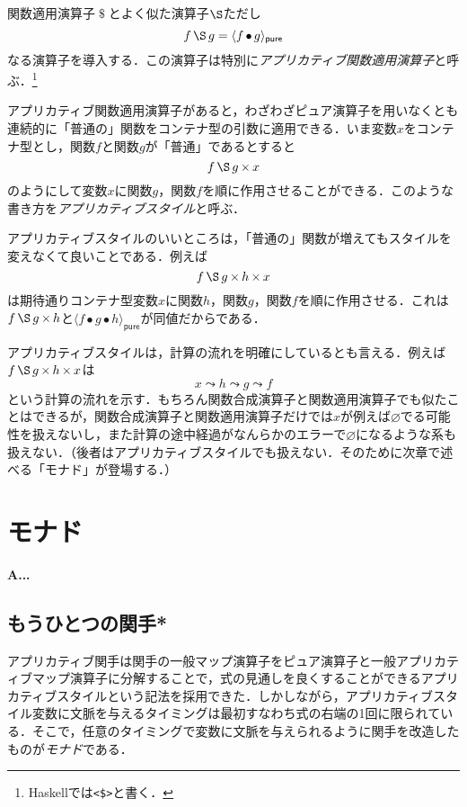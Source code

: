\documentclass[twocolumn]{jsbook}
\newcommand{\programminglanguage}[1]{\textsf{#1}}
\newcommand{\haskell}{\programminglanguage{Haskell}}
\newcommand{\code}[1]{\texttt{#1}}
\newcommand{\keyword}[1]{{\emph{#1}}}
\newenvironment{leader}{\begingroup\bf}{\endgroup}
\DeclareMathOperator{\hsklApplicativeApply}{\S}
\DeclareMathOperator{\hsklApplicativeMap}{\times}
\newcommand{\hsklNothing}{\varnothing}
\newcommand{\hsklPure}[1]{\langle#1\rangle_\textsf{pure}}
\DeclareMathOperator{\mathApply}{\$}
\DeclareMathOperator{\mathCompose}{\bullet}
\begin{document}
関数適用演算子$\mathApply$とよく似た演算子$\hsklApplicativeApply$ただし$$f\hsklApplicativeApply g=\hsklPure{f\mathCompose g}$$なる演算子を導入する．この演算子は特別に\keyword{アプリカティブ関数適用演算子}と呼ぶ．\footnote{\haskell では\code{<\$>}と書く．}

アプリカティブ関数適用演算子があると，わざわざピュア演算子を用いなくとも連続的に「普通の」関数をコンテナ型の引数に適用できる．いま変数$x$をコンテナ型とし，関数$f$と関数$g$が「普通」であるとすると$$f\hsklApplicativeApply g\hsklApplicativeMap x$$のようにして変数$x$に関数$g$，関数$f$を順に作用させることができる．このような書き方を\keyword{アプリカティブスタイル}と呼ぶ．

アプリカティブスタイルのいいところは，「普通の」関数が増えてもスタイルを変えなくて良いことである．例えば$$f\hsklApplicativeApply g\hsklApplicativeMap h\hsklApplicativeMap x$$は期待通りコンテナ型変数$x$に関数$h$，関数$g$，関数$f$を順に作用させる．これは$f\hsklApplicativeApply g\hsklApplicativeMap h$と$\hsklPure{f\mathCompose g\mathCompose h}$が同値だからである．

アプリカティブスタイルは，計算の流れを明確にしているとも言える．例えば$f\hsklApplicativeApply g\hsklApplicativeMap h\hsklApplicativeMap x$は$$x\leadsto h\leadsto g\leadsto f$$という計算の流れを示す．もちろん関数合成演算子と関数適用演算子でも似たことはできるが，関数合成演算子と関数適用演算子だけでは$x$が例えば$\hsklNothing$でる可能性を扱えないし，また計算の途中経過がなんらかのエラーで$\hsklNothing$になるような系も扱えない．（後者はアプリカティブスタイルでも扱えない．そのために次章で述べる「モナド」が登場する．）

\chapter{モナド}

\begin{leader}
A...
\end{leader}


\section{もうひとつの関手*}


アプリカティブ関手は関手の一般マップ演算子をピュア演算子と一般アプリカティブマップ演算子に分解することで，式の見通しを良くすることができるアプリカティブスタイルという記法を採用できた．しかしながら，アプリカティブスタイル変数に文脈を与えるタイミングは最初すなわち式の右端の1回に限られている．そこで，任意のタイミングで変数に文脈を与えられるように関手を改造したものが\keyword{モナド}である．
\end{document}
